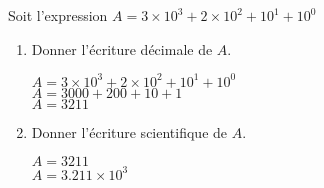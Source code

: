     Soit l'expression $A=3\times 10^3 + 2\times 10^2 + 10^1 + 10^0$
    \begin{enumerate}
        \item Donner l'écriture décimale de $A$.

        {\red
            $A=3\times 10^3 + 2\times 10^2 + 10^1 + 10^0$\\
            $A=\num{3000} + 200 + 10 + 1$\\
            $A=\num{3211}$
        }
        \item Donner l'écriture scientifique de $A$.

        {\red
            $A=\num{3211}$\\
            $A=\num{3.211}\times 10^3$
        }
    \end{enumerate}

